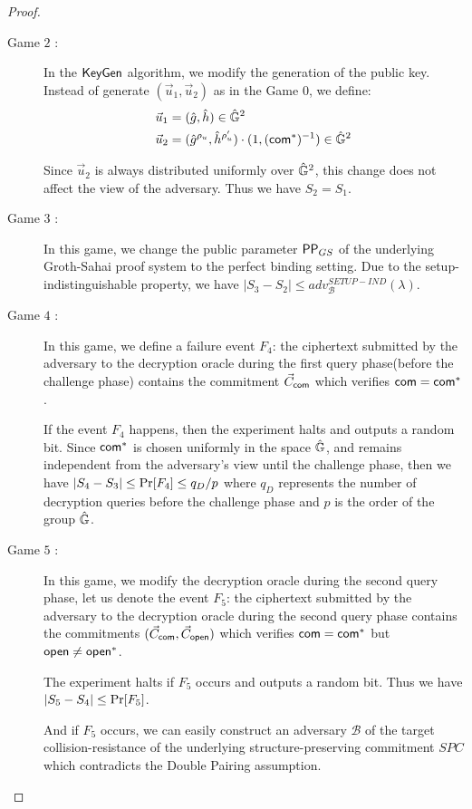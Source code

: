 \begin{proof}
\begin{description}
  \item[\textsf{Game} $2$ :] In the ${\mathsf{KeyGen}}$ algorithm, we modify the generation of the public key. Instead of generate $(\vec{u}_1, \vec{u}_2)$ as in the \textsf{Game} 0, we define:
    \begin{align*}
      \vec{u}_1 &= (\hat{g}, \hat{h}) \in \hat{\mathbb{G}}^2\\
      \vec{u}_2 &= (\hat{g}^{\rho_u}, \hat{h}^{\rho_u'}) \cdot (1, (\mathsf{com}^*)^{-1}) \in \hat{\mathbb{G}}^2
    \end{align*}

    Since $\vec{u}_2$ is always distributed uniformly over $\hat{\mathbb{G}}^2$, this change does not affect the view of the adversary. Thus we have $S_2 = S_1$.

  \item[\textsf{Game} $3$ :] In this game, we change the public parameter $\mathsf{PP}_{GS}$ of the underlying Groth-Sahai proof system to the perfect binding setting. Due to the setup-indistinguishable property, we have $|S_3 - S_2| \leq adv_{\mathcal{B}}^{SETUP-IND}(\lambda)$.

  \item[\textsf{Game} $4$ :] In this game, we define a failure event $F_4$: the ciphertext submitted by the adversary to the decryption oracle during the first query phase(before the challenge phase) contains the commitment $\vec{C}_{\mathsf{com}}$ which verifies $\mathsf{com} = \mathsf{com}^*$.

    If the event $F_4$ happens, then the experiment halts and outputs a random bit. Since $\mathsf{com}^*$ is chosen uniformly in the space $\hat{\mathbb{G}}$, and remains independent from the adversary's view until the challenge phase, then we have $|S_4 - S_3| \leq \operatorname{Pr}[F_4] \leq q_D/p$ where $q_D$ represents the number of decryption queries before the challenge phase and $p$ is the order of the group $\hat{\mathbb{G}}$.

  \item[\textsf{Game} $5$ :] In this game, we modify the decryption oracle during the second query phase, let us denote the event $F_5$: the ciphertext submitted by the adversary to the decryption oracle during the second query phase contains the commitments $(\vec{C}_{\mathsf{com}}, \vec{C}_{\mathsf{open}})$ which verifies $\mathsf{com} = \mathsf{com}^*$ but $\mathsf{open} \neq \mathsf{open}^*$.

    The experiment halts if $F_5$ occurs and outputs a random bit. Thus we have $|S_5- S_4| \leq \operatorname{Pr}[F_5]$.

    And if $F_5$ occurs, we can easily construct an adversary $\mathcal{B}$ of the target collision-resistance of the underlying structure-preserving commitment $SPC$ which contradicts the Double Pairing assumption.


\end{description}
\end{proof}
